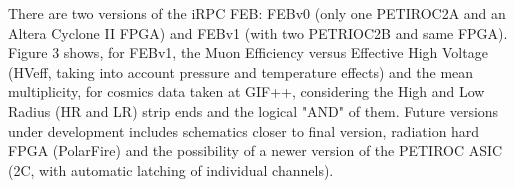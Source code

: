 There are two versions of the iRPC FEB: FEBv0 (only one PETIROC2A and an Altera Cyclone II FPGA) and FEBv1 (with two PETRIOC2B and same FPGA). Figure 3 shows, for FEBv1, the Muon Efficiency versus Effective High  Voltage (HVeff, taking into account pressure and temperature effects) and the mean multiplicity, for cosmics data taken at GIF++, considering the High and Low Radius (HR and LR) strip ends and the logical "AND" of them. Future versions under development includes schematics closer to final version, radiation hard FPGA (PolarFire) and the possibility of a newer version of the PETIROC ASIC (2C, with automatic latching of individual channels).  










